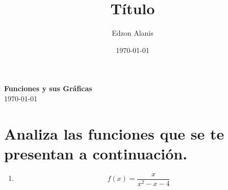 \documentclass[12pt]{article}
\title{Título}
\author{Edzon Alanis}
\date{\today}
\begin{document}
\begin{center}
    \textbf{\large Funciones y sus Gráficas} \\[0.5 cm]
    \today
\end{center}
\section*{Analiza las funciones que se te presentan a continuación.}

\begin{enumerate}
    \item \[f(x) = \frac{x}{x^2-x-4}\]
\end{enumerate}


\end{document}

